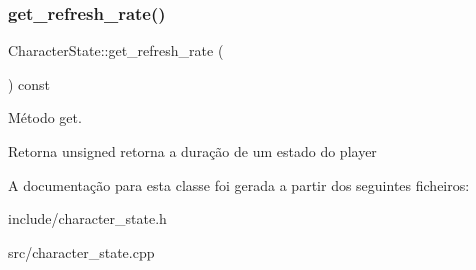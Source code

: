 \subsubsection{\texorpdfstring{get\+\_\+refresh\+\_\+rate()}{get\_refresh\_rate()}}
{\footnotesize\ttfamily Character\+State\+::get\+\_\+refresh\+\_\+rate (\begin{DoxyParamCaption}{ }\end{DoxyParamCaption}) const\hspace{0.3cm}{\ttfamily [inline]}}



Método get. 

\begin{DoxyReturn}{Retorna}
unsigned retorna a duração de um estado do player 
\end{DoxyReturn}


A documentação para esta classe foi gerada a partir dos seguintes ficheiros\+:\begin{DoxyCompactItemize}
\item 
include/character\+\_\+state.\+h\item 
src/character\+\_\+state.\+cpp\end{DoxyCompactItemize}
